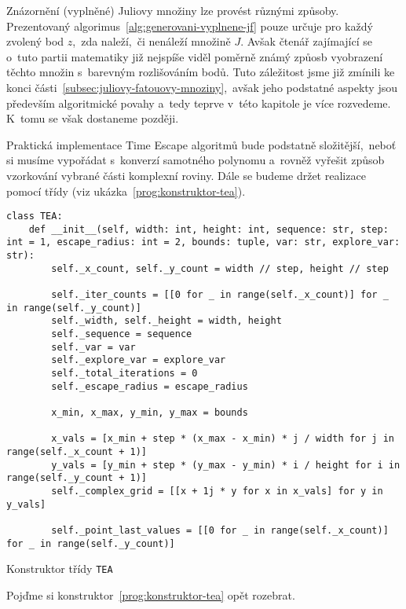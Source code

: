 Znázornění (vyplněné) Juliovy množiny lze provést různými způsoby. Prezentovaný algorimus~\ref{alg:generovani-vyplnene-jf} pouze určuje pro každý zvolený bod $z$,~zda naleží,~či nenáleží množině $J$. Avšak čtenář zajímající se o~tuto partii matematiky již nejspíše viděl poměrně známý způosb vyobrazení těchto množin s~barevným rozlišováním bodů. Tuto záležitost jsme již zmínili ke konci části~\ref{subsec:juliovy-fatouovy-mnoziny},~avšak jeho podstatné aspekty jsou především algoritmické povahy a~tedy teprve v~této kapitole je více rozvedeme. K~tomu se však dostaneme později.

Praktická implementace Time Escape algoritmů bude podstatně složitější,~neboť si musíme vypořádat s~konverzí samotného polynomu a~rovněž vyřešit způsob vzorkování vybrané části komplexní roviny. Dále se budeme držet realizace pomocí třídy (viz ukázka~\ref{prog:konstruktor-tea}).
\begin{program}[h]
\begin{lstlisting}[style=python]
class TEA:
    def __init__(self, width: int, height: int, sequence: str, step: int = 1, escape_radius: int = 2, bounds: tuple, var: str, explore_var: str):
        self._x_count, self._y_count = width // step, height // step
        
        self._iter_counts = [[0 for _ in range(self._x_count)] for _ in range(self._y_count)]
        self._width, self._height = width, height
        self._sequence = sequence
        self._var = var
        self._explore_var = explore_var
        self._total_iterations = 0
        self._escape_radius = escape_radius

        x_min, x_max, y_min, y_max = bounds

        x_vals = [x_min + step * (x_max - x_min) * j / width for j in range(self._x_count + 1)]
        y_vals = [y_min + step * (y_max - y_min) * i / height for i in range(self._y_count + 1)]
        self._complex_grid = [[x + 1j * y for x in x_vals] for y in y_vals]

        self._point_last_values = [[0 for _ in range(self._x_count)] for _ in range(self._y_count)]
\end{lstlisting}
    \caption{Konstruktor třídy \texttt{TEA}}
    \label{prog:konstruktor-tea}
\end{program}
Pojďme si konstruktor~\ref{prog:konstruktor-tea} opět rozebrat.

